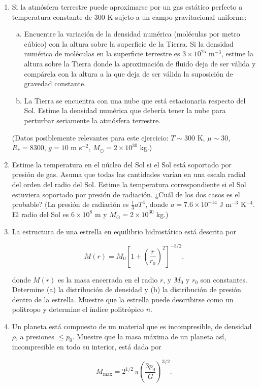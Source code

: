 \begin{enumerate}
\item Si la atmósfera terrestre puede aproximarse por un gas estático perfecto a temperatura constante de 300 K sujeto a un campo gravitacional uniforme:
\begin{enumerate}[(a)]
\item Encuentre la variación de la densidad numérica (moléculas por metro cúbico) con la altura sobre la superficie de la Tierra. Si la densidad numérica de moléculas en la superficie terrestre es $3 \times 10^{25}$ m$^{-3}$, estime la altura sobre la Tierra donde la aproximación de fluido deja de ser válida y compárela con la altura a la que deja de ser válida la suposición de gravedad constante.

\item La Tierra se encuentra con una nube que está estacionaria respecto del Sol. Estime la densidad numérica que debería tener la nube para perturbar seriamente la atmósfera terrestre.
\end{enumerate}

(Datos posiblemente relevantes para este ejercicio: $T \sim 300$ K, $\mu \sim 30$, $R_* = 8300$, $g = 10$ m s$^{-2}$, $M_\odot = 2 \times 10^{30}$ kg.)

\item Estime la temperatura en el núcleo del Sol si el Sol está soportado por presión de gas. Asuma que todas las cantidades varían en una escala radial del orden del radio del Sol. Estime la temperatura correspondiente si el Sol estuviera soportado por presión de radiación. ¿Cuál de los dos casos es el probable? (La presión de radiación es $\frac{1}{3}aT^4$, donde $a = 7.6 \times 10^{-14}$ J m$^{-3}$ K$^{-4}$. El radio del Sol es $6 \times 10^8$ m y $M_\odot = 2 \times 10^{30}$ kg.)

\item La estructura de una estrella en equilibrio hidrostático está descrita por

$$ M(r) = M_0\left[1 + \left(\frac{r}{r_0}\right)^2\right]^{-3/2}. $$

donde $M(r)$ es la masa encerrada en el radio $r$, y $M_0$ y $r_0$ son constantes. Determine (a) la distribución de densidad y (b) la distribución de presión dentro de la estrella. Muestre que la estrella puede describirse como un politropo y determine el índice politrópico $n$.

\item Un planeta está compuesto de un material que es incompresible, de densidad $\rho$, a presiones $\le p_0$. Muestre que la masa máxima de un planeta así, incompresible en todo su interior, está dada por

$$ M_{\mathrm{max}} = 2^{1/2}\,\pi\left(\frac{3p_0}{G}\right)^{3/2}. $$
\end{enumerate}